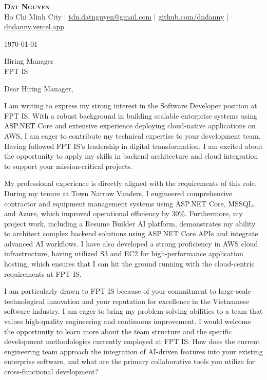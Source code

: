 \documentclass[letterpaper,11pt]{article}
\begin{document}
\begin{center}
\textbf{\Huge \scshape Dat Nguyen} \\ \vspace{1pt}
\small Ho Chi Minh City $|$ \href{mailto:tdn.datnguyen@gmail.com}{\underline{tdn.datnguyen@gmail.com}} $|$
\href{https://github.com/dndanny}{\underline{github.com/dndanny}} $|$
\href{https://dndanny.vercel.app}{\underline{dndanny.vercel.app}}
\end{center}

\today

\vspace{20pt}

Hiring Manager \\
FPT IS \\

\vspace{20pt}

Dear Hiring Manager,

I am writing to express my strong interest in the Software Developer position at FPT IS. With a robust background in building scalable enterprise systems using ASP.NET Core and extensive experience deploying cloud-native applications on AWS, I am eager to contribute my technical expertise to your development team. Having followed FPT IS's leadership in digital transformation, I am excited about the opportunity to apply my skills in backend architecture and cloud integration to support your mission-critical projects.

My professional experience is directly aligned with the requirements of this role. During my tenure at Town Narrow Vanders, I engineered comprehensive contractor and equipment management systems using ASP.NET Core, MSSQL, and Azure, which improved operational efficiency by 30\%. Furthermore, my project work, including a Resume Builder AI platform, demonstrates my ability to architect complex backend solutions using ASP.NET Core APIs and integrate advanced AI workflows. I have also developed a strong proficiency in AWS cloud infrastructure, having utilized S3 and EC2 for high-performance application hosting, which ensures that I can hit the ground running with the cloud-centric requirements at FPT IS.

I am particularly drawn to FPT IS because of your commitment to large-scale technological innovation and your reputation for excellence in the Vietnamese software industry. I am eager to bring my problem-solving abilities to a team that values high-quality engineering and continuous improvement. I would welcome the opportunity to learn more about the team structure and the specific development methodologies currently employed at FPT IS. How does the current engineering team approach the integration of AI-driven features into your existing enterprise software, and what are the primary collaborative tools you utilize for cross-functional development?
\end{document}
